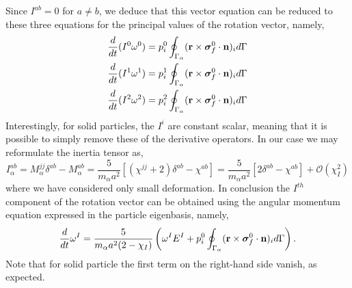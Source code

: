 Since $I^{ab} = 0$ for $a \neq b$, we deduce that this vector equation can be reduced to these three equations for the principal values of the rotation vector, namely,
\begin{align*}
    \frac{d}{dt} (I^0   \omega^0)
    = 
    p_i^0\oint_{\Gamma_{\alpha}} (\textbf{r}\times\bm\sigma_f^0\cdot \textbf{n})_i d\Gamma \\
    \frac{d}{dt} (I^1   \omega^1)
    = 
    p_i^1\oint_{\Gamma_{\alpha}} (\textbf{r}\times\bm\sigma_f^0\cdot \textbf{n})_i d\Gamma \\
    \frac{d}{dt} (I^2   \omega^2)
    = 
    p_i^2\oint_{\Gamma_{\alpha}} (\textbf{r}\times\bm\sigma_f^0\cdot \textbf{n})_i d\Gamma 
\end{align*}
Interestingly, for solid particles, the $I^i$ are constant scalar, meaning that it is possible to simply remove these of the derivative operators. 
In our case we may reformulate the inertia tensor as, 
\begin{equation*}
    I^{ab}_\alpha
    = 
    M^{jj}_\alpha \delta^{ab}
    - M^{ab}_\alpha
    = 
    \frac{5}{m_\alpha a^2}[(\chi^{jj} + 2) \delta^{ab}
    - \chi^{ab}]
    = 
    \frac{5}{m_\alpha a^2}[2\delta^{ab} - \chi^{ab}]
    + \mathcal{O}(\chi_I^2)
\end{equation*}
where we have considered only small deformation. 
In conclusion the $I^{th}$ component of the rotation vector can be obtained using the angular momentum equation expressed in the particle eigenbasis, namely, 
\begin{align*}
    \frac{d}{dt}\omega^I 
    = 
    \frac{5}{m_\alpha a^2 (2 - \chi_I)}
    \left(
    \omega^I E^I 
    +
    p_i^0\oint_{\Gamma_{\alpha}} (\textbf{r}\times\bm\sigma_f^0\cdot \textbf{n})_i d\Gamma 
    \right). 
\end{align*}
Note that for solid particle the first term on the right-hand side vanish, as expected. 